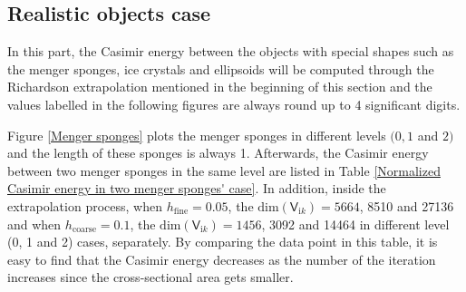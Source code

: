 \subsection{Realistic objects case}
In this part, the Casimir energy between the objects with special shapes such as the menger sponges, ice crystals and ellipsoids will be computed 
through the Richardson extrapolation mentioned in the beginning of this section and the values labelled in the following figures are always round up to 4 significant digits. 

Figure \ref{Menger sponges} plots the menger sponges in different levels $(0, 1 $ and $ 2)$ and the length of these sponges is always 1. Afterwards, the Casimir 
energy between two menger sponges in the same level are listed in Table \ref{Normalized Casimir energy in two menger sponges' case}. 
In addition, inside the extrapolation process, when $h_{\text{fine}} = 0.05$, the $\text{dim}(\mathsf{V}_{\mathrm{i}k}) = 5664$, 8510 and 27136 and 
when $h_{\text{coarse}} = 0.1$, the $\text{dim}(\mathsf{V}_{\mathrm{i}k}) = 1456$, 3092 and 14464 in different level (0, 1 and 2) cases, separately. 
By comparing the data 
point in this table, it is easy to find that the Casimir energy decreases as the number of the iteration increases since the cross-sectional 
area gets smaller.

